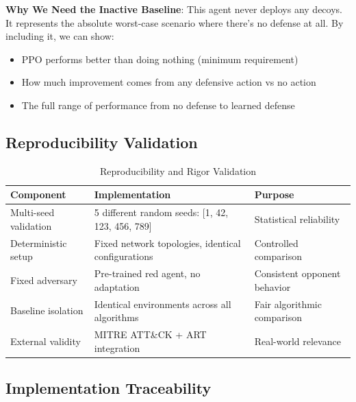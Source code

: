 \documentclass[12pt,oneside]{article}
\begin{document}
\textbf{Why We Need the Inactive Baseline}: This agent never deploys any decoys. It represents the absolute worst-case scenario where there's no defense at all. By including it, we can show:
\begin{itemize}
\item PPO performs better than doing nothing (minimum requirement)
\item How much improvement comes from any defensive action vs no action
\item The full range of performance from no defense to learned defense
\end{itemize}

\subsection{Reproducibility Validation}

\begin{table}[H]
\centering
\caption{Reproducibility and Rigor Validation}
\label{tab:reproducibility}
\small
\begin{tabular}{|p{3cm}|p{5cm}|p{4cm}|}
\hline
\rowcolor{cwBorder!30} \textbf{Component} & \textbf{Implementation} & \textbf{Purpose} \\
\hline
Multi-seed validation & 5 different random seeds: [1, 42, 123, 456, 789] & Statistical reliability \\
\hline
Deterministic setup & Fixed network topologies, identical configurations & Controlled comparison \\
\hline
Fixed adversary & Pre-trained red agent, no adaptation & Consistent opponent behavior \\
\hline
Baseline isolation & Identical environments across all algorithms & Fair algorithmic comparison \\
\hline
External validity & MITRE ATT\&CK + ART integration & Real-world relevance \\
\hline
\end{tabular}
\end{table}

\subsection{Implementation Traceability}
\end{document}
